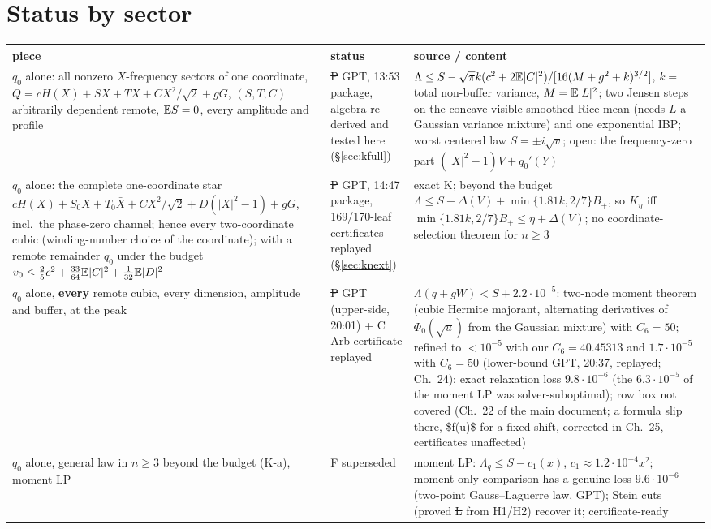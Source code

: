 \documentclass[11pt,a4paper]{article}
\begin{document}
\section{Status by sector}
\begin{center}\small\begin{tabular}{p{4.6cm}p{2.2cm}p{8.4cm}}\toprule
piece & status & source / content\\\midrule
$q_0$ alone: all nonzero $X$-frequency sectors of one coordinate, $Q=cH(X)+SX+T\bar X+CX^2/\sqrt2+gG$, $(S,T,C)$ arbitrarily dependent remote, $\mathbb{E} S=0$, every amplitude and profile & \st{P} GPT, 13:53 package, algebra re-derived and tested here (\S\ref{sec:kfull}) & $\Lambda\le S-\sqrt\pi k(c^2+2\mathbb{E}|C|^2)/[16(M+g^2+k)^{3/2}]$, $k=$ total non-buffer variance, $M=\mathbb{E}|L|^2$; two Jensen steps on the concave visible-smoothed Rice mean (needs $L$ a Gaussian variance mixture) and one exponential IBP; worst centered law $S=\pm i\sqrt v$; open: the frequency-zero part $(|X|^2-1)V+q_0'(Y)$\\
$q_0$ alone: the complete one-coordinate star $cH(X)+S_0X+T_0\bar X+CX^2/\sqrt2+D(|X|^2-1)+gG$, incl.\ the phase-zero channel; hence every two-coordinate cubic (winding-number choice of the coordinate); with a remote remainder $q_0$ under the budget $v_0\le\frac25c^2+\frac{33}{64}\mathbb{E}|C|^2+\frac1{32}\mathbb{E}|D|^2$ & \st{P} GPT, 14:47 package, 169/170-leaf certificates replayed (\S\ref{sec:knext}) & exact K; beyond the budget $\Lambda\le S-\Delta(V)+\min\{1.81k,2/7\}B_+$, so $K_\eta$ iff $\min\{1.81k,2/7\}B_+\le\eta+\Delta(V)$; no coordinate-selection theorem for $n\ge3$\\
$q_0$ alone, \textbf{every} remote cubic, every dimension, amplitude and buffer, at the peak & \st{P} GPT (upper-side, 20:01) + \st{C} Arb certificate replayed & $\Lambda(q+gW)<S+2.2\cdot10^{-5}$: two-node moment theorem (cubic Hermite majorant, alternating derivatives of $\Phi_0(\sqrt u)$ from the Gaussian mixture) with $C_6=50$; refined to $<10^{-5}$ with our $C_6=40.45313$ and $1.7\cdot10^{-5}$ with $C_6=50$ (lower-bound GPT, 20:37, replayed; Ch.~24); exact relaxation loss $9.8\cdot10^{-6}$ (the $6.3\cdot10^{-5}$ of the moment LP was solver-suboptimal); row box not covered (Ch.~22 of the main document; a formula slip there, \$f(u)\$ for a fixed shift, corrected in Ch.~25, certificates unaffected)\\
$q_0$ alone, general law in $n\ge3$ beyond the budget (K-a), moment LP & \st{F} superseded & moment LP: $\Lambda_{q}\le S-c_1(x)$, $c_1\approx1.2\cdot10^{-4}x^2$; moment-only comparison has a genuine loss $9.6\cdot10^{-6}$ (two-point Gauss--Laguerre law, GPT); Stein cuts (proved \st{L} from H1/H2) recover it; certificate-ready\\

\end{tabular}
\end{center}
\end{document}
